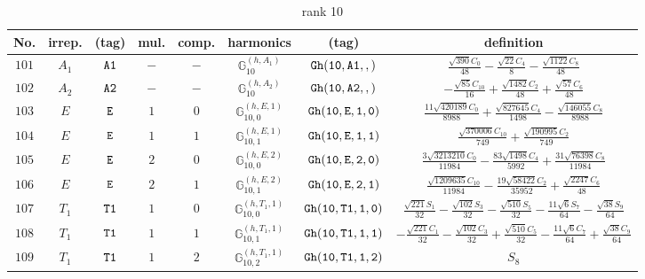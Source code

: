 \documentclass[fleqn,8pt]{jsarticle}
\begin{document}
\begin{table}[ht!]
\begin{center}
\caption{rank 10}
\renewcommand{\arraystretch}{1.3}
\begin{tabular}{cccccccc} \hline \hline
No. & irrep. & (tag) & mul. & comp. & harmonics & (tag) & definition \\ \hline
$ 101 $ & $ A_{1} $ & $ {\tt A1} $ & $ - $ & $ - $ & $ \mathbb{G}_{10}^{(h,A_{1})} $ & $ {\tt Gh(10,A1,,)} $ & $ \frac{\sqrt{390} C_{0}}{48} - \frac{\sqrt{22} C_{4}}{8} - \frac{\sqrt{1122} C_{8}}{48} $ \\
$ 102 $ & $ A_{2} $ & $ {\tt A2} $ & $ - $ & $ - $ & $ \mathbb{G}_{10}^{(h,A_{2})} $ & $ {\tt Gh(10,A2,,)} $ & $ - \frac{\sqrt{85} C_{10}}{16} + \frac{\sqrt{1482} C_{2}}{48} + \frac{\sqrt{57} C_{6}}{48} $ \\
$ 103 $ & $ E $ & $ {\tt E} $ & $ 1 $ & $ 0 $ & $ \mathbb{G}_{10,0}^{(h,E,1)} $ & $ {\tt Gh(10,E,1,0)} $ & $ \frac{11 \sqrt{420189} C_{0}}{8988} + \frac{\sqrt{827645} C_{4}}{1498} - \frac{\sqrt{146055} C_{8}}{8988} $ \\
$ 104 $ & $ E $ & $ {\tt E} $ & $ 1 $ & $ 1 $ & $ \mathbb{G}_{10,1}^{(h,E,1)} $ & $ {\tt Gh(10,E,1,1)} $ & $ \frac{\sqrt{370006} C_{10}}{749} + \frac{\sqrt{190995} C_{2}}{749} $ \\
$ 105 $ & $ E $ & $ {\tt E} $ & $ 2 $ & $ 0 $ & $ \mathbb{G}_{10,0}^{(h,E,2)} $ & $ {\tt Gh(10,E,2,0)} $ & $ \frac{3 \sqrt{3213210} C_{0}}{11984} - \frac{83 \sqrt{1498} C_{4}}{5992} + \frac{31 \sqrt{76398} C_{8}}{11984} $ \\
$ 106 $ & $ E $ & $ {\tt E} $ & $ 2 $ & $ 1 $ & $ \mathbb{G}_{10,1}^{(h,E,2)} $ & $ {\tt Gh(10,E,2,1)} $ & $ \frac{\sqrt{1209635} C_{10}}{11984} - \frac{19 \sqrt{58422} C_{2}}{35952} + \frac{\sqrt{2247} C_{6}}{48} $ \\
$ 107 $ & $ T_{1} $ & $ {\tt T1} $ & $ 1 $ & $ 0 $ & $ \mathbb{G}_{10,0}^{(h,T_{1},1)} $ & $ {\tt Gh(10,T1,1,0)} $ & $ \frac{\sqrt{221} S_{1}}{32} - \frac{\sqrt{102} S_{3}}{32} - \frac{\sqrt{510} S_{5}}{32} - \frac{11 \sqrt{6} S_{7}}{64} - \frac{\sqrt{38} S_{9}}{64} $ \\
$ 108 $ & $ T_{1} $ & $ {\tt T1} $ & $ 1 $ & $ 1 $ & $ \mathbb{G}_{10,1}^{(h,T_{1},1)} $ & $ {\tt Gh(10,T1,1,1)} $ & $ - \frac{\sqrt{221} C_{1}}{32} - \frac{\sqrt{102} C_{3}}{32} + \frac{\sqrt{510} C_{5}}{32} - \frac{11 \sqrt{6} C_{7}}{64} + \frac{\sqrt{38} C_{9}}{64} $ \\
$ 109 $ & $ T_{1} $ & $ {\tt T1} $ & $ 1 $ & $ 2 $ & $ \mathbb{G}_{10,2}^{(h,T_{1},1)} $ & $ {\tt Gh(10,T1,1,2)} $ & $ S_{8} $ \\

\end{tabular}
\end{center}
\end{table}
\end{document}
